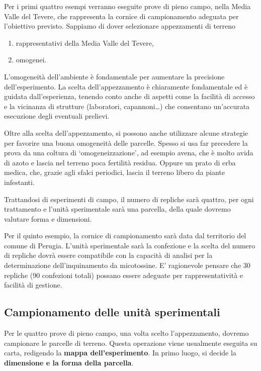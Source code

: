 \documentclass[a4paper,12pt,oneside]{book}
\providecommand{\tightlist}{%
  \setlength{\itemsep}{0pt}\setlength{\parskip}{0pt}}
\theoremstyle{definition}
\theoremstyle{definition}
\theoremstyle{definition}
\theoremstyle{remark}
\begin{document}
Per i primi quattro esempi verranno eseguite prove di pieno campo, nella
Media Valle del Tevere, che rappresenta la cornice di campionamento
adeguata per l'obiettivo previsto. Sappiamo di dover selezionare
appezzamenti di terreno

\begin{enumerate}
\def\labelenumi{\arabic{enumi}.}
\tightlist
\item
  rappresentativi della Media Valle del Tevere,
\item
  omogenei.
\end{enumerate}

L'omogeneità dell'ambiente è fondamentale per aumentare la precisione
dell'esperimento. La scelta dell'appezzamento è chiaramente fondamentale
ed è guidata dall'esperienza, tenendo conto anche di aspetti come la
facilità di accesso e la vicinanza di strutture (laboratori,
capannoni\ldots{}) che consentano un'accurata esecuzione degli eventuali
prelievi.

Oltre alla scelta dell'appezzamento, si possono anche utilizzare alcune
strategie per favorire una buona omogeneità delle parcelle. Spesso si
usa far precedere la prova da una coltura di `omogeneizzazione', ad
esempio avena, che è molto avida di azoto e lascia nel terreno poca
fertilità residua. Oppure un prato di erba medica, che, grazie agli
sfalci periodici, lascia il terreno libero da piante infestanti.

Trattandosi di esperimenti di campo, il numero di repliche sarà quattro,
per ogni trattamento e l'unità sperimentale sarà una parcella, della
quale dovremo valutare forma e dimensioni.

Per il quinto esempio, la cornice di campionamento sarà data dal
territorio del comune di Perugia. L'unità sperimentale sarà la
confezione e la scelta del numero di repliche dovrà essere compatibile
con la capacità di analisi per la determinazione dell'inquinamento da
micotossine. E' ragionevole pensare che 30 repliche (90 confezioni
totali) possano essere adeguate per rappresentatività e facilità di
gestione.

\subsection{Campionamento delle unità
sperimentali}\label{campionamento-delle-unita-sperimentali}

Per le quattro prove di pieno campo, una volta scelto l'appezzamento,
dovremo campionare le parcelle di terreno. Questa operazione viene
usualmente eseguita su carta, redigendo la \textbf{mappa
dell'esperimento}. In primo luogo, si decide la \textbf{dimensione e la
forma della parcella}.
\end{document}
